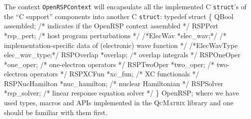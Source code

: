 The \LibName context {\tt{}OpenRSPContext} will encapsulate all the implemented C
{\tt{}struct}'s of the ``\LibName C support'' components into another C
{\tt{}struct}:
\nwenddocs{}\endmoddef
typedef struct \{
    QBool assembled;               /* indicates if the OpenRSP context assembled */
    RSPPert *rsp_pert;             /* host program perturbations */
    /*ElecWav *elec_wav;*/           /* implementation-specific data of (electronic) wave function */
    /*ElecWavType elec_wav_type;*/
    RSPOverlap *overlap;           /* overlap integrals */
    RSPOneOper *one_oper;          /* one-electron operators */
    RSPTwoOper *two_oper;          /* two-electron operators */
    RSPXCFun *xc_fun;              /* XC functionals */
    RSPNucHamilton *nuc_hamilton;  /* nuclear Hamiltonian */
    RSPSolver *rsp_solver;         /* linear response equation solver */
\} OpenRSP;
\nwendcode{}where we have used types, macros and APIs implemented in the
\textsc{QcMatrix} library and one should be familiar with them first.

